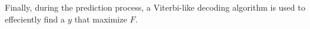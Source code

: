Finally, during the prediction process, a Viterbi-like decoding algorithm is used to effeciently find a $y$ that maximize $F$.








                  

